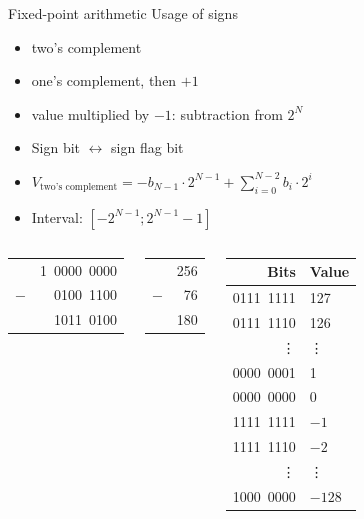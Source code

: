 \documentclass[usenames,dvipsnames,aspectratio=169]{beamer}
\begin{document}
\begin{frame}{Fixed-point arithmetic}
  Usage of signs
  \begin{itemize}
    \item two's complement
    \item one's complement, then $+1$
    \item value multiplied by $-1$: subtraction from $2^N$
    \item Sign bit $\leftrightarrow$ sign flag bit
    \item $V_{\textrm{two's complement}} = -b_{N-1}\cdot2^{N-1} +
\sum_{i=0}^{N-2}b_i\cdot2^i$
    \item Interval: $[-2^{N-1}; 2^{N-1}-1]$
  \end{itemize}
  \begin{columns}
      \begin{center}
      \begin{tabular}{rr}
          & 1\ 0000\ 0000\\
      $-$ &    0100\ 1100\\ \hline
          &    1011\ 0100\\
      \end{tabular}
      \end{center}
      \begin{center}
      \begin{tabular}{rr}
          & 256\\
      $-$ & 76\\ \hline
          & 180\\
      \end{tabular}
      \end{center}
      \begin{center}
      \tiny{
      \begin{tabular}{r|l}
      Bits & Value\\ \hline
      0111\ 1111 & 127\\
      0111\ 1110 & 126\\
      \vdots & \vdots\\
      0000\ 0001 & 1\\
      0000\ 0000 & 0\\
      1111\ 1111 & $-1$\\
      1111\ 1110 & $-2$\\
      \vdots & \vdots\\
      1000\ 0000 & $-128$\\
      \end{tabular}
      }
      \end{center}
  \end{columns}
\end{frame}
\end{document}
